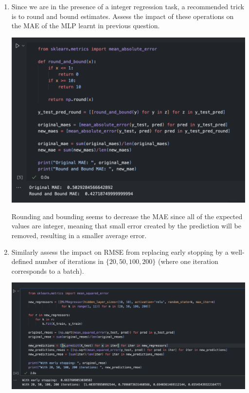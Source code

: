 \documentclass[12pt]{article}
\begin{document}
\begin{enumerate}
    \item Since we are in the presence of a integer regression task, a recommended trick is to
    round and bound estimates. Assess the impact of these operations on the MAE of the MLP
    learnt in previous question.

    \begin{center}
        \includegraphics[scale=0.6]{images/code8.png}
    \end{center}

    Rounding and bounding seems to decrease the MAE since all of the expected values are integer, meaning that small error created by the prediction will be removed, resulting in a smaller average error.

    \item Similarly assess the impact on RMSE from replacing early stopping by a well-defined
    number of iterations in $\{20,50,100,200\}$ (where one iteration corresponds to a batch).

    \begin{center}
        \includegraphics[scale=0.4]{images/code9.png}
    \end{center}


\end{enumerate}
\end{document}
